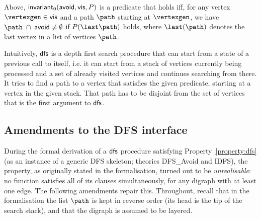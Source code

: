 Above, $\textsf{\upshape invariant}_0(\textsf{\upshape avoid},\textsf{\upshape vis},P)$ is a predicate that holds iff, for any vertex $\vertexgen\in\vis$ and a path $\path$ starting at $\vertexgen$, we have $\path\; \cap\; \avoid \neq \emptyset$ if $P(\last \path)$ holds, where $\last(\path)$ denotes the last vertex in a list of vertices $\path$.

Intuitively, $\textsf{\upshape dfs}$ is a depth first search procedure that can start from a state of a previous call to itself, i.e. it can start from a stack of vertices currently being processed and a set of already visited vertices and continues searching from there.
It tries to find a path to a vertex that satisfies the given predicate, starting at a vertex in the given stack.
That path has to be disjoint from the set of vertices that is the first argument to $\textsf{\upshape dfs}$.

\subsection{Amendments to the DFS interface}
\label{sec:dfs-amendments}

During the formal derivation of a $\textsf{\upshape dfs}$ procedure satisfying Property~\ref{property:dfs}
(as an instance of a generic DFS skeleton; theories \textsf{DFS\_Avoid} and \textsf{IDFS}),
the property, as originally stated in the formalisation, turned out to be
\emph{unrealisable}: no function satisfies all of its clauses simultaneously, for any
digraph with at least one edge.  The following amendments repair this.  Throughout,
recall that in the formalisation the list $\path$ is kept in reverse order (its head is
the tip of the search stack), and that the digraph is assumed to be layered.

